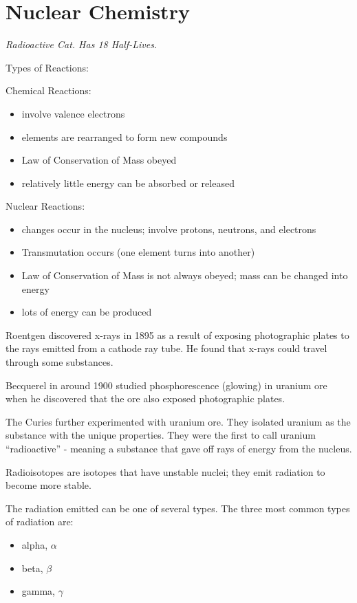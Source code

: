 \documentclass[../hchem.tex]{subfiles}
\begin{document}
\chapter{Nuclear Chemistry}
\textit{Radioactive Cat. Has 18 Half-Lives.}

Types of Reactions:

Chemical Reactions:
\begin{itemize}
    \item involve valence electrons 
    \item elements are rearranged to form new compounds 
    \item Law of Conservation of Mass obeyed 
    \item relatively little energy can be absorbed or released
\end{itemize}

Nuclear Reactions:
\begin{itemize}
    \item changes occur in the nucleus; involve protons, neutrons, and electrons 
    \item Transmutation occurs (one element turns into another)
    \item Law of Conservation of Mass is not always obeyed; mass can be changed into energy 
    \item lots of energy can be produced 
\end{itemize}

Roentgen discovered x-rays in 1895 as a result of exposing photographic plates to the rays emitted from a cathode ray tube. He found that x-rays could travel through some substances.

Becquerel in around 1900 studied phosphorescence (glowing) in uranium ore when he discovered that the ore also exposed photographic plates.

The Curies further experimented with uranium ore. They isolated uranium as the substance with the unique properties.
They were the first to call uranium ``radioactive'' - meaning a substance that gave off rays of energy from the nucleus.

Radioisotopes are isotopes that have unstable nuclei; they emit radiation to become more stable.

The radiation emitted can be one of several types. The three most common types of radiation are:
\begin{itemize}
    \item alpha, $\alpha$
    \item beta, $\beta$
    \item gamma, $\gamma$
\end{itemize}
\end{document}
